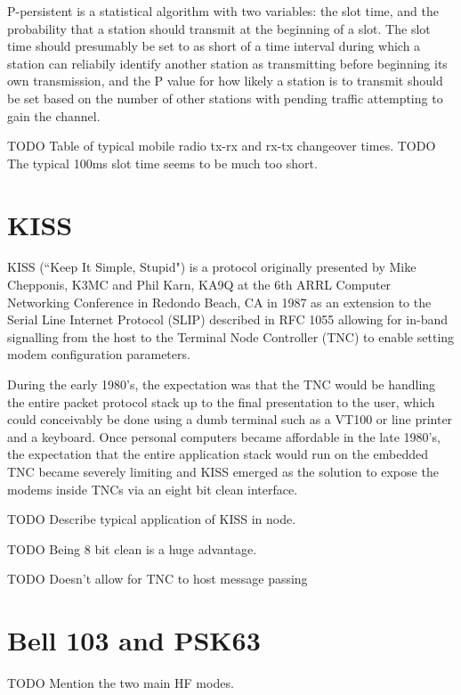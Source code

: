 P-persistent is a statistical algorithm with two variables: the slot time, and the
probability that a station should transmit at the beginning of a slot. The slot time
should presumably be set to as short of a time interval during which a station can
reliabily identify another station as transmitting before beginning its own transmission,
and the P value for how likely a station is to transmit should be set based on the 
number of other stations with pending traffic attempting to gain the channel.

TODO Table of typical mobile radio tx-rx and rx-tx changeover times.
TODO The typical 100ms slot time seems to be much too short.

\chapter{KISS}

KISS (``Keep It Simple, Stupid") is a protocol originally presented by 
Mike Chepponis, K3MC and Phil Karn, KA9Q at the 6th ARRL Computer Networking
Conference in Redondo Beach, CA in 1987 as an extension to the Serial Line 
Internet Protocol (SLIP) described in RFC 1055 allowing for in-band signalling from 
the host to the Terminal Node Controller (TNC) to enable setting modem 
configuration parameters. 

During the early 1980's, the expectation was that the TNC would be handling 
the entire packet protocol stack up to the final presentation to the user, which
could conceivably be done using a dumb terminal such as a VT100 or line printer 
and a keyboard. 
Once personal computers became affordable in the late 1980's, the expectation that
the entire application stack would run on the embedded TNC became severely limiting
and KISS emerged as the solution to expose the modems inside TNCs via 
an eight bit clean interface.

TODO Describe typical application of KISS in node.

TODO Being 8 bit clean is a huge advantage.

TODO Doesn't allow for TNC to host message passing

\chapter{Bell 103 and PSK63}

TODO Mention the two main HF modes. 

